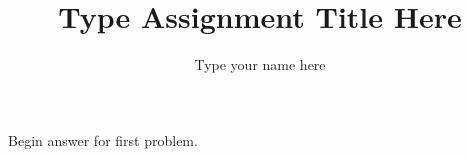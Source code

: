 \documentclass[12pt]{article}
\title{Type Assignment Title Here}
\author{Type your name here}
\newenvironment{problem}[2][Problem]{\begin{trivlist}
\item[\hskip \labelsep {\bfseries #1}\hskip \labelsep {\bfseries #2.}]}{\end{trivlist}}
\begin{document}
\maketitle

 
\begin{problem}{1}
	Begin answer for first problem.
\end{problem}

	
\end{document}
